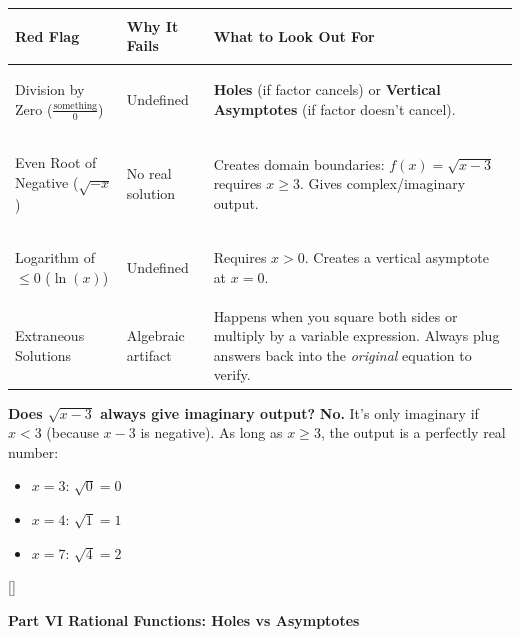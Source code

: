 \documentclass[11pt, letterpaper]{article}
\newcommand{\tealsections}{%
  \titleformat{\section}{\large\bfseries\color{sectionteal}}{}{0em}{}[\color{sectionteal}\titlerule]%
  \titleformat{\subsection}{\normalsize\bfseries\color{sectionteal!80!black}}{}{0em}{}%
}
\newcommand{\partbanner}[3]{%
  \begin{tcolorbox}[colback=#1, colframe=#2, boxrule=1.2pt, arc=4pt,
    left=8pt, right=8pt, top=6pt, bottom=6pt]
    \begin{center}{\LARGE\bfseries #3}\end{center}
  \end{tcolorbox}%
}
\begin{document}
\noindent
{\renewcommand{\arraystretch}{1.6}
\begin{tabularx}{\textwidth}{>{\bfseries\raggedright\arraybackslash}p{3.5cm}
                              >{\raggedright\arraybackslash}p{3.5cm}
                              >{\raggedright\arraybackslash}X}
\toprule
\rowcolor{tableheaderorange}
\textbf{Red Flag} & \textbf{Why It Fails} & \textbf{What to Look Out For} \\
\midrule
\rowcolor{rowOr} Division by Zero \newline ($\frac{\text{something}}{0}$) & Undefined & \textbf{Holes} (if factor cancels) or \textbf{Vertical Asymptotes} (if factor doesn't cancel). \\
\rowcolor{rowA}  Even Root of Negative \newline ($\sqrt{-x}$) & No real solution & Creates domain boundaries: $f(x) = \sqrt{x - 3}$ requires $x \geq 3$. Gives complex/imaginary output. \\
\rowcolor{rowOr} Logarithm of $\leq 0$ \newline ($\ln(x)$) & Undefined & Requires $x > 0$. Creates a vertical asymptote at $x = 0$. \\
\rowcolor{rowA}  Extraneous Solutions & Algebraic artifact & Happens when you square both sides or multiply by a variable expression. Always plug answers back into the \emph{original} equation to verify. \\
\bottomrule
\end{tabularx}}

\begin{tcolorbox}[colback=part4bg, colframe=sectionorange, arc=3pt, boxrule=1pt]
\textbf{Does $\sqrt{x-3}$ always give imaginary output?} \textbf{No.} It's only imaginary if $x < 3$ (because $x-3$ is negative). As long as $x \geq 3$, the output is a perfectly real number:
\begin{itemize}[noitemsep, leftmargin=*]
  \item $x = 3$: $\sqrt{0} = 0$
  \item $x = 4$: $\sqrt{1} = 1$
  \item $x = 7$: $\sqrt{4} = 2$
\end{itemize}
\end{tcolorbox}

\newpage

\tealsections
{}
{}
\partbanner{part5bg}{sectionteal}{Part VI \quad Rational Functions: Holes vs Asymptotes}
\end{document}
